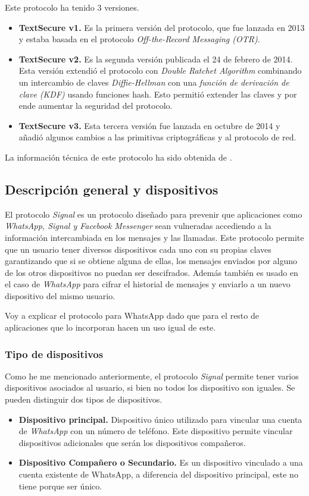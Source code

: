 Este protocolo ha tenido 3 versiones.
\begin{itemize}
	\item \textbf{TextSecure v1.} Es la primera versión del protocolo, que fue lanzada en 2013 y estaba basada en el protocolo \emph{Off-the-Record Messaging (OTR)}.
	\item \textbf{TextSecure v2.} Es la segunda versión publicada el 24 de febrero de 2014. Esta versión extendió el protocolo con \emph{Double Ratchet Algorithm} combinando un intercambio de claves \emph{Diffie-Hellman} con una \emph{función de derivación de clave (KDF)} usando funciones hash. Esto permitió extender las claves y por ende aumentar la seguridad del protocolo.
	\item \textbf{TextSecure v3.} Esta tercera versión fue lanzada en octubre de 2014 y añadió algunos cambios a las primitivas criptográficas y al protocolo de red.
\end{itemize}

La información técnica de este protocolo ha sido obtenida de \cite{November2021b}.

\subsection{Descripción general y dispositivos}
El protocolo \emph{Signal} es un protocolo diseñado para prevenir que aplicaciones como \emph{WhatsApp, Signal y Facebook Messenger} sean vulneradas accediendo a la información intercambiada en los mensajes y las llamadas. Este protocolo permite que un usuario tener diversos dispositivos cada uno con su propias claves garantizando que si se obtiene alguna de ellas, los mensajes enviados por alguno de los otros dispositivos no puedan ser descifrados. Además también es usado en el caso de \emph{WhatsApp} para cifrar el historial de mensajes y enviarlo a un nuevo dispositivo del mismo usuario.

Voy a explicar el protocolo para WhatsApp dado que para el resto de aplicaciones que lo incorporan hacen un uso igual de este.

\subsubsection{Tipo de dispositivos}
Como he me mencionado anteriormente, el protocolo \emph{Signal} permite tener varios dispositivos asociados al usuario, si bien no todos los dispositivo son iguales. Se pueden distinguir dos tipos de dispositivos.
\begin{itemize}
	\item \textbf{Dispositivo principal.} Dispositivo único utilizado para vincular una cuenta de \emph{WhatsApp} con un número de teléfono. Este dispositivo permite vincular dispositivos adicionales que serán los dispositivos compañeros.
	\item \textbf{Dispositivo Compañero o Secundario.} Es un dispositivo vinculado a una cuenta existente de WhatsApp, a diferencia del dispositivo principal, este no tiene porque ser único.
\end{itemize}

